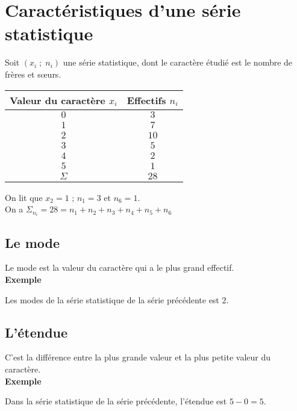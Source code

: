 \newpage

\vspace*{-2cm}

\section{Caractéristiques d'une série statistique}

Soit $\left(x_i \; ; \; n_i \right)$ une série statistique, dont le caractère étudié est le nombre de frères et sœurs. \\

\begin{tabular}{c|c}
Valeur du caractère $x_i$ & Effectifs $n_i$ \\
\hline
$0$ & $3$ \\
$1$ & $7$ \\
$2$ & $10$ \\
$3$ & $5$ \\
$4$ & $2$ \\
$5$ & $1$ \\
\hline
$\Sigma$ & $28$ \\
\end{tabular}

\vspace*{.3cm}

On lit que $x_2 = 1$ ; $n_1 = 3$ et $n_6 = 1$. \\

On a $\Sigma_{n_i} = 28 = n_1 + n_2 + n_3 + n_4 + n_5 + n_6$ 

\subsection{Le mode}

Le mode est la  valeur du caractère qui a le plus grand effectif. \\

\textbf{Exemple}

Les modes de la série statistique de la série précédente est $2$.

\subsection{L'étendue}

C'est la différence entre la plus grande valeur et la plus petite valeur du caractère. \\

\textbf{Exemple}

Dans la série statistique de la série précédente, l'étendue est $5 - 0 = 5$.

